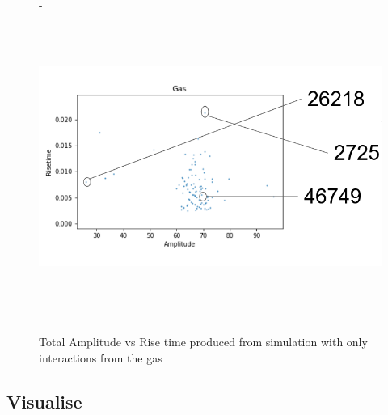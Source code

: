 \documentclass[a4paper]{article}
\begin{document}
\begin{figure}[H]-
        \centering
        \includegraphics[height=10cm]{Capturegas.PNG}
        \caption{Total Amplitude vs Rise time produced from simulation with only interactions from the gas}
        \label{fig:south2d}
        \end{figure}
\subsection{Visualise}
\end{document}
